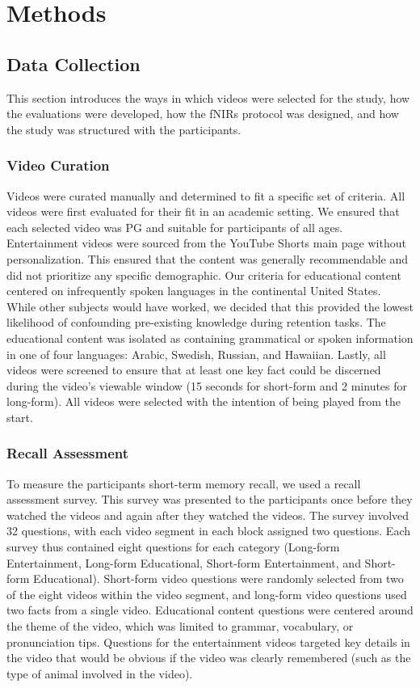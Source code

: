 \documentclass[10pt, twocolumn]{article}
\begin{document}
\section{Methods}
\subsection{Data Collection}
This section introduces the ways in which videos were selected for the study, how the evaluations were developed, how the fNIRs protocol was designed, and how the study was structured with the participants.

\subsubsection{Video Curation}
Videos were curated manually and determined to fit a specific set of criteria. All videos were first evaluated for their fit in an academic setting. We ensured that each selected video was PG and suitable for participants of all ages. Entertainment videos were sourced from the YouTube Shorts main page without personalization. This ensured that the content was generally recommendable and did not prioritize any specific demographic. Our criteria for educational content centered on infrequently spoken languages in the continental United States. While other subjects would have worked, we decided that this provided the lowest likelihood of confounding pre-existing knowledge during retention tasks. The educational content was isolated as containing grammatical or spoken information in one of four languages: Arabic, Swedish, Russian, and Hawaiian. Lastly, all videos were screened to ensure that at least one key fact could be discerned during the video's viewable window (15 seconds for short-form and 2 minutes for long-form). All videos were selected with the intention of being played from the start.

\subsubsection{Recall Assessment}
To measure the participants short-term memory recall, we used a recall assessment survey. This survey was presented to the participants once before they watched the videos and again after they watched the videos. The survey involved 32 questions, with each video segment in each block assigned two questions. Each survey thus contained eight questions for each category (Long-form Entertainment, Long-form Educational, Short-form Entertainment, and Short-form Educational). Short-form video questions were randomly selected from two of the eight videos within the video segment, and long-form video questions used two facts from a single video. Educational content questions were centered around the theme of the video, which was limited to grammar, vocabulary, or pronunciation tips. Questions for the entertainment videos targeted key details in the video that would be obvious if the video was clearly remembered (such as the type of animal involved in the video).
\end{document}
